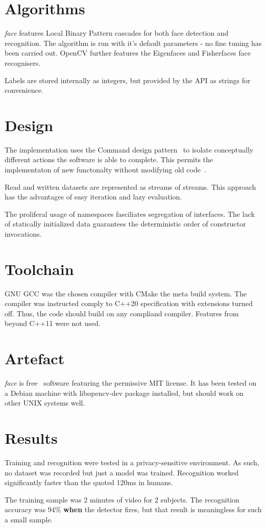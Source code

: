 \documentclass{article}
\newcommand{\face}[0]{\textit{face }}
\newcommand{\para}[0]{\\ \par \noindent}
\begin{document}
\section{Algorithms}
\face features Local Binary Pattern cascades for both face detection and recognition.
The algorithm is run with it's default parameters - no fine tuning has been carried out.
OpenCV further features the Eigenfaces and Fisherfaces face recognisers.
\para
Labels are stored internally as integers, but provided by the API as strings for convenience.


\section{Design}
The implementation uses the Command design pattern~\cite{schmid} to isolate conceptually different actions the software is able to complete.
This permits the implementaton of new functonalty without modifying old code~\cite{kalemis}.
\para
Read and written datasets are represented as streams of streams.
This approach has the advantages of easy iteration and lazy evaluation.
\para
The proliferal usage of namespaces fasciliates segregation of interfaces.
The lack of statically initialized data guarantees the deterministic order of constructor invocations.


\section{Toolchain}
GNU GCC was the chosen compiler with CMake the meta build system.
The compiler was instructed comply to C++20 specification with extensions turned off.
Thus, the code should build on any compliand compiler.
Features from beyond C++11 were not used.


\section{Artefact}
\face is free~\cite{miro} software featuring the permissive MIT license.
It has been tested on a Debian machine with libopencv-dev package installed, but should work on other UNIX systems well. 


\section{Results}
Training and recognition were tested in a privacy-sensitive environment.
As such, no dataset was recorded but just a model was trained.
Recognition worked significantly faster than the quoted 120ms in humans.
\para
The training sample was 2 minutes of video for 2 subjects.
The recognition accuracy was 94\% \textbf{when} the detector fires, but that result is meaningless for such a small sample.
\end{document}
